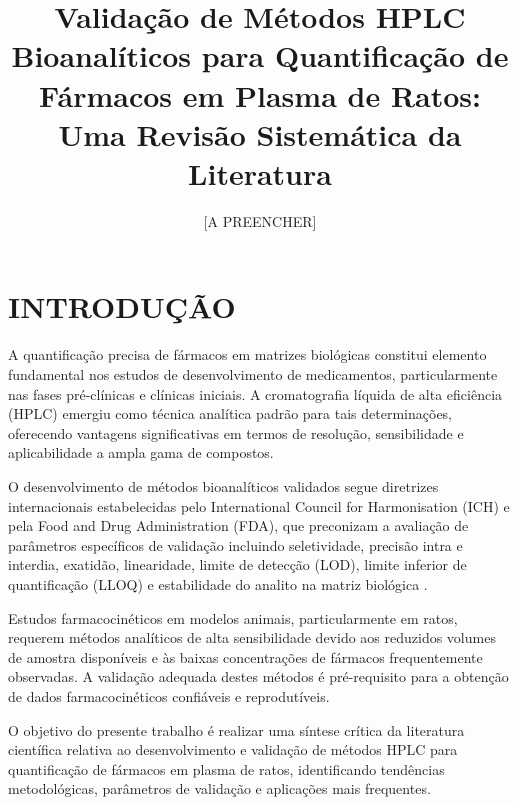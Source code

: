 
\graphicspath{{./Figures/}{./logo/}}

\title{Validação de Métodos HPLC Bioanalíticos para Quantificação de Fármacos em Plasma de Ratos: Uma Revisão Sistemática da Literatura}

\author[1]{[A PREENCHER]}
\affil[1]{[A PREENCHER]}



\maketitle

\section{INTRODUÇÃO}

A quantificação precisa de fármacos em matrizes biológicas constitui elemento fundamental nos estudos de desenvolvimento de medicamentos, particularmente nas fases pré-clínicas e clínicas iniciais. A cromatografia líquida de alta eficiência (HPLC) emergiu como técnica analítica padrão para tais determinações, oferecendo vantagens significativas em termos de resolução, sensibilidade e aplicabilidade a ampla gama de compostos.

O desenvolvimento de métodos bioanalíticos validados segue diretrizes internacionais estabelecidas pelo International Council for Harmonisation (ICH) e pela Food and Drug Administration (FDA), que preconizam a avaliação de parâmetros específicos de validação incluindo seletividade, precisão intra e interdia, exatidão, linearidade, limite de detecção (LOD), limite inferior de quantificação (LLOQ) e estabilidade do analito na matriz biológica \cite{ich2005, fda2018}.

Estudos farmacocinéticos em modelos animais, particularmente em ratos, requerem métodos analíticos de alta sensibilidade devido aos reduzidos volumes de amostra disponíveis e às baixas concentrações de fármacos frequentemente observadas. A validação adequada destes métodos é pré-requisito para a obtenção de dados farmacocinéticos confiáveis e reprodutíveis.

O objetivo do presente trabalho é realizar uma síntese crítica da literatura científica relativa ao desenvolvimento e validação de métodos HPLC para quantificação de fármacos em plasma de ratos, identificando tendências metodológicas, parâmetros de validação e aplicações mais frequentes.

